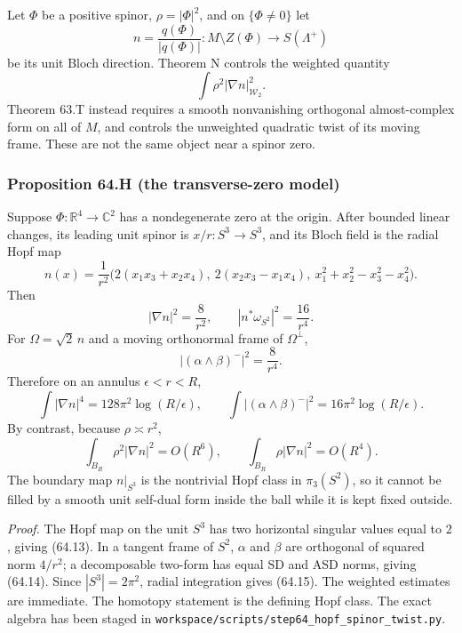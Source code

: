 \documentclass[
  10pt,
]{report}
\renewcommand{\backslash}{\mathord{\text{\textbackslash}}}%
\renewcommand{\setminus}{\mathbin{\backslash}}}
\begin{document}
Let \(\Phi\) be a positive spinor, \(\rho=|\Phi|^2\), and on
\(\{\Phi\ne0\}\) let \[
 n=\frac{q(\Phi)}{|q(\Phi)|}:M\setminus Z(\Phi)\to S(\Lambda^+)
\] be its unit Bloch direction. Theorem N controls the weighted quantity
\[
 \int\rho^2|\nabla n|_{\mathcal W_2}^2.
\] Theorem 63.T instead requires a smooth nonvanishing orthogonal
almost-complex form on all of \(M\), and controls the unweighted
quadratic twist of its moving frame. These are not the same object near
a spinor zero.

\hypertarget{proposition-64.h-the-transverse-zero-model}{%
\subsubsection{Proposition 64.H (the transverse-zero
model)}\label{proposition-64.h-the-transverse-zero-model}}

Suppose \(\Phi:\mathbb R^4\to\mathbb C^2\) has a nondegenerate zero at
the origin. After bounded linear changes, its leading unit spinor is
\(x/r:S^3\to S^3\), and its Bloch field is the radial Hopf map \[
 n(x)=\frac1{r^2}
 \bigl(2(x_1x_3+x_2x_4),\ 2(x_2x_3-x_1x_4),\ x_1^2+x_2^2-x_3^2-x_4^2\bigr).
\tag{64.12}
\] Then \[
 |\nabla n|^2=\frac8{r^2},\qquad
 |n^*\omega_{S^2}|^2=\frac{16}{r^4}.
\tag{64.13}
\] For \(\Omega=\sqrt2\,n\) and a moving orthonormal frame of
\(\Omega^\perp\), \[
 |(\alpha\wedge\beta)^-|^2=\frac8{r^4}.
\tag{64.14}
\] Therefore on an annulus \(\epsilon<r<R\), \[
 \int|\nabla n|^4=128\pi^2\log(R/\epsilon),\qquad
 \int|(\alpha\wedge\beta)^-|^2=16\pi^2\log(R/\epsilon).
\tag{64.15}
\] By contrast, because \(\rho\asymp r^2\), \[
 \int_{B_R}\rho^2|\nabla n|^2=O(R^6),
 \qquad \int_{B_R}\rho|\nabla n|^2=O(R^4).
\tag{64.16}
\] The boundary map \(n|_{S^3}\) is the nontrivial Hopf class in
\(\pi_3(S^2)\), so it cannot be filled by a smooth unit self-dual form
inside the ball while it is kept fixed outside.

\emph{Proof.} The Hopf map on the unit \(S^3\) has two horizontal
singular values equal to \(2\), giving (64.13). In a tangent frame of
\(S^2\), \(\alpha\) and \(\beta\) are orthogonal of squared norm
\(4/r^2\); a decomposable two-form has equal SD and ASD norms, giving
(64.14). Since \(|S^3|=2\pi^2\), radial integration gives (64.15). The
weighted estimates are immediate. The homotopy statement is the defining
Hopf class. The exact algebra has been staged in
\texttt{workspace/scripts/step64\_hopf\_spinor\_twist.py}.
\end{document}
